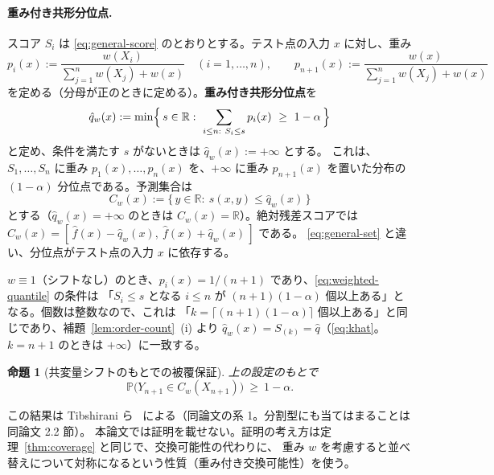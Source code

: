 \documentclass[a4paper,11pt]{jsarticle}
\theoremstyle{definition}
\theoremstyle{plain}
\newtheorem{proposition}[definition]{命題}
\theoremstyle{remark}
\newcommand{\Prob}{\mathbb{P}}
\newcommand{\Real}{\mathbb{R}}
\newcommand{\qhat}{\hat{q}}
\newcommand{\fhat}{\hat{f}}
\begin{document}
\paragraph{重み付き共形分位点.}
スコア $S_i$ は \eqref{eq:general-score} のとおりとする。テスト点の入力 $x$ に対し、重み
\begin{equation}
  \label{eq:weighted-prob}
  p_i(x):=\frac{w(X_i)}{\sum_{j=1}^{n}w(X_j)+w(x)}\quad(i=1,\dots,n),\qquad
  p_{n+1}(x):=\frac{w(x)}{\sum_{j=1}^{n}w(X_j)+w(x)}
\end{equation}
を定める（分母が正のときに定める）。\textbf{重み付き共形分位点}を
\begin{equation}
  \label{eq:weighted-quantile}
  \qhat_w(x):=\min\Bigl\{\,s\in\Real:\ \sum_{i\le n:\ S_i\le s}p_i(x)\ \ge\ 1-\alpha\,\Bigr\}
\end{equation}
と定め、条件を満たす $s$ がないときは $\qhat_w(x):=+\infty$ とする。
これは、$S_1,\dots,S_n$ に重み $p_1(x),\dots,p_n(x)$ を、$+\infty$ に重み $p_{n+1}(x)$ を置いた分布の
$(1-\alpha)$ 分位点である。予測集合は
\begin{equation}
  \label{eq:weighted-set}
  C_w(x):=\{\,y\in\Real:\ s(x,y)\le\qhat_w(x)\,\}
\end{equation}
とする（$\qhat_w(x)=+\infty$ のときは $C_w(x)=\Real$）。絶対残差スコアでは
$C_w(x)=[\,\fhat(x)-\qhat_w(x),\ \fhat(x)+\qhat_w(x)\,]$ である。
\eqref{eq:general-set} と違い、分位点がテスト点の入力 $x$ に依存する。

$w\equiv1$（シフトなし）のとき、$p_i(x)=1/(n+1)$ であり、\eqref{eq:weighted-quantile} の条件は
「$S_i\le s$ となる $i\le n$ が $(n+1)(1-\alpha)$ 個以上ある」となる。個数は整数なので、これは
「$k=\lceil(n+1)(1-\alpha)\rceil$ 個以上ある」と同じであり、補題~\ref{lem:order-count}~(i) より
$\qhat_w(x)=S_{(k)}=\qhat$（\eqref{eq:khat}。$k=n+1$ のときは $+\infty$）に一致する。

\begin{proposition}[共変量シフトのもとでの被覆保証]
  \label{prop:weighted}
  上の設定のもとで
  \begin{equation*}
    \Prob\bigl(Y_{n+1}\in C_w(X_{n+1})\bigr)\ \ge\ 1-\alpha .
  \end{equation*}
\end{proposition}

この結果は Tibshirani ら~\cite{tibshirani2019covariate} による（同論文の系 1。分割型にも当てはまることは同論文 2.2 節）。
本論文では証明を載せない。証明の考え方は定理~\ref{thm:coverage} と同じで、交換可能性の代わりに、
重み $w$ を考慮すると並べ替えについて対称になるという性質（重み付き交換可能性）を使う。
\end{document}

